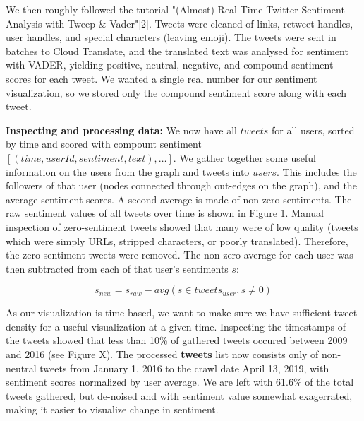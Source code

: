 \documentclass[11pt]{article}
\begin{document}
We then roughly followed the tutorial "(Almost) Real-Time Twitter Sentiment Analysis with Tweep \& Vader"[2]. Tweets were cleaned of links, retweet handles, user handles, and special characters (leaving emoji). The tweets were sent in batches to Cloud Translate, and the translated text was analysed for sentiment with VADER, yielding positive, neutral, negative, and compound sentiment scores for each tweet. We wanted a single real number for our sentiment visualization, so we stored only the compound sentiment score along with each tweet.\newline

\textbf{Inspecting and processing data:} We now have all $tweets$ for all users, sorted by time and scored with compount sentiment $[(time, userId, sentiment, text), \dots]$. We gather together some useful information on the users from the graph and tweets into $users$. This includes the followers of that user (nodes connected through out-edges on the graph), and the average sentiment scores. A second average is made of non-zero sentiments.\newline
The raw sentiment values of all tweets over time is shown in Figure 1. Manual inspection of zero-sentiment tweets showed that many were of low quality (tweets which were simply URLs, stripped characters, or poorly translated). Therefore, the zero-sentiment tweets were removed. The non-zero average for each user was then subtracted from each of that user's sentiments $s$:

\[
    s_{new} = s_{raw} - avg(s\in tweets_{user}, s \neq 0)
\]

As our visualization is time based, we want to make sure we have sufficient tweet density for a useful visualization at a given time. Inspecting the timestamps of the tweets showed that less than 10\% of gathered tweets occured between 2009 and 2016 (see Figure X). The processed \textbf{tweets} list now consists only of non-neutral tweets from January 1, 2016 to the crawl date April 13, 2019, with sentiment scores normalized by user average. We are left with 61.6\% of the total tweets gathered, but de-noised and with sentiment value somewhat exagerrated, making it easier to visualize change in sentiment.
\end{document}
